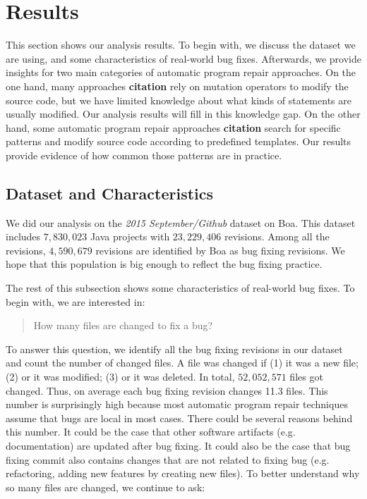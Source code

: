 \documentclass{sig-alternate-05-2015}
\newcommand{\todo}[1]
  {{\scriptsize \textbf{\color{red} {#1}}}}
\begin{document}
\section{Results}


This section shows our analysis results. To begin with, we discuss the dataset
we are using, and some characteristics of real-world bug fixes. Afterwards, we
provide insights for two main categories of automatic program repair approaches.
On the one hand, many approaches \todo{citation} rely on mutation operators to
modify the source code, but we have limited knowledge about what kinds of
statements are usually modified. Our analysis results will fill in this
knowledge gap. On the other hand, some automatic program repair approaches
\todo{citation} search for specific patterns and modify source code according to
predefined templates. Our results provide evidence of how common those
patterns are in practice.

\subsection{Dataset and Characteristics}

We did our analysis on the \emph{2015 September/Github} dataset on Boa. This
dataset includes $7,830,023$ Java projects with $23,229,406$ revisions. Among
all the revisions, $4,590,679$ revisions are identified by Boa as bug fixing
revisions. We hope that this population is big enough to reflect the bug fixing
practice.

The rest of this subsection shows some characteristics of real-world bug fixes.
To begin with, we are interested in:

\begin{quote}
	How many files are changed to fix a bug?
\end{quote}

To answer this question, we identify all the bug fixing revisions in our dataset
and count the number of changed files. A file was changed if (1) it was a new
file; (2) or it was modified; (3) or it was deleted. In total, $52,052,571$
files got changed. Thus, on average each bug fixing revision changes 11.3 files.
This number is surprisingly high because most automatic program repair
techniques assume that bugs are local in most cases. There could be several
reasons behind this number. It could be the case that other software artifacts
(e.g.  documentation) are updated after bug fixing. It could also be the case
that bug fixing commit also contains changes that are not related to fixing bug
(e.g. refactoring, adding new features by creating new files). To better
understand why so many files are changed, we continue to ask:
\end{document}
